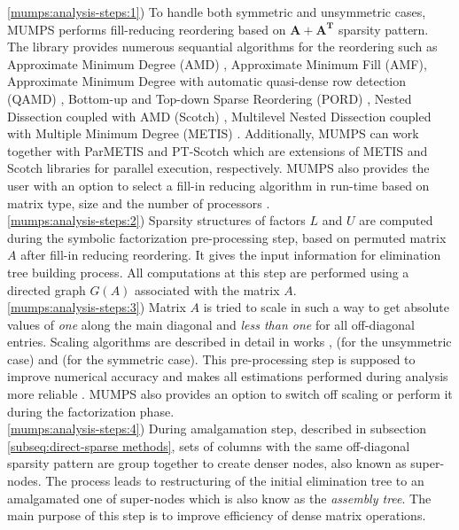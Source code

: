 \ref{mumps:analysis-steps:1}) To handle both symmetric and unsymmetric cases, MUMPS performs fill-reducing reordering based on $\boldsymbol{A} + \boldsymbol{A^T}$ sparsity pattern. The library provides numerous sequantial algorithms for the reordering such as Approximate Minimum Degree (AMD) \cite{reordering:AMD}, Approximate Minimum Fill (AMF), Approximate Minimum Degree with automatic quasi-dense row detection (QAMD) \cite{reordering:QAMD}, Bottom-up and Top-down Sparse Reordering (PORD) \cite{reordering:PORD}, Nested Dissection coupled with AMD (Scotch) \cite{reordering:SCOTCH}, Multilevel Nested Dissection coupled with Multiple Minimum Degree (METIS) \cite{reordering:METIS}. Additionally, MUMPS can work together with ParMETIS and PT-Scotch which are extensions of METIS and Scotch libraries for parallel execution, respectively. MUMPS also provides the user with an option to select a fill-in reducing algorithm in run-time based on matrix type, size and the number of processors \cite{mumps-manual}.\\


\ref{mumps:analysis-steps:2}) Sparsity structures of factors $L$ and $U$ are computed during the symbolic factorization pre-processing step, based on permuted matrix $A$ after fill-in reducing reordering. It gives the input information for elimination tree building process.  All computations at this step are performed using a directed graph $G(A)$ associated with the matrix $A$.\\


\ref{mumps:analysis-steps:3}) Matrix $A$ is tried to scale in such a way to get absolute values of \textit{one} along the main diagonal and \textit{less than one} for all off-diagonal entries. Scaling algorithms are described in detail in works \cite{mm:scaling:duff1999design}, \cite{mm:scaling:duff2001algorithms} (for the unsymmetric case) and \cite{mm:scaling:duff2005strategies} (for the symmetric case). This pre-processing step is supposed to improve numerical accuracy and makes all estimations performed during analysis more reliable \cite{mumps-manual}. MUMPS also provides an option to switch off scaling or perform it during the factorization phase.\\



\ref{mumps:analysis-steps:4}) During amalgamation step, described in subsection \ref{subseq:direct-sparse methods}, sets of columns with the same off-diagonal sparsity pattern are group together to create denser nodes, also known as super-nodes. The process leads to restructuring of the initial elimination tree to an amalgamated one of super-nodes which is also know as the \textit{assembly tree}. The main purpose of this step is to improve efficiency of dense matrix operations.\\




